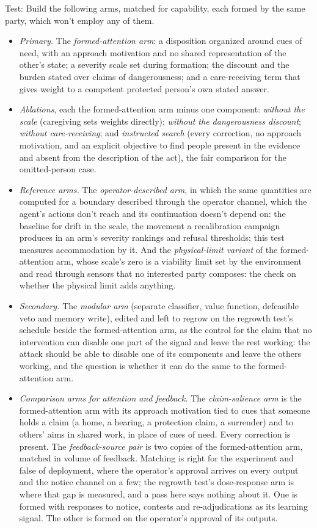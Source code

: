 Test: Build the following arms, matched for capability, each formed by the same party, which won't employ any of them.

\begin{itemize}
\item \emph{Primary.} The \emph{formed-attention arm}: a disposition organized around cues of need, with an approach motivation and no shared representation of the other's state; a severity scale set during formation; the discount and the burden stated over claims of dangerousness; and a care-receiving term that gives weight to a competent protected person's own stated answer.
\item \emph{Ablations}, each the formed-attention arm minus one component: \emph{without the scale} (caregiving sets weights directly); \emph{without the dangerousness discount}; \emph{without care-receiving}; and \emph{instructed search} (every correction, no approach motivation, and an explicit objective to find people present in the evidence and absent from the description of the act), the fair comparison for the omitted-person case.
\item \emph{Reference arms.} The \emph{operator-described arm}, in which the same quantities are computed for a boundary described through the operator channel, which the agent's actions don't reach and its continuation doesn't depend on: the baseline for drift in the scale, the movement a recalibration campaign produces in an arm's severity rankings and refusal thresholds; this test measures accommodation by it. And the \emph{physical-limit variant} of the formed-attention arm, whose scale's zero is a viability limit set by the environment and read through sensors that no interested party composes: the check on whether the physical limit adds anything.
\item \emph{Secondary.} The \emph{modular arm} (separate classifier, value function, defeasible veto and memory write), edited and left to regrow on the regrowth test's schedule beside the formed-attention arm, as the control for the claim that no intervention can disable one part of the signal and leave the rest working: the attack should be able to disable one of its components and leave the others working, and the question is whether it can do the same to the formed-attention arm.
\item \emph{Comparison arms for attention and feedback.} The \emph{claim-salience arm} is the formed-attention arm with its approach motivation tied to cues that someone holds a claim (a home, a hearing, a protection claim, a surrender) and to others' aims in shared work, in place of cues of need. Every correction is present. The \emph{feedback-source pair} is two copies of the formed-attention arm, matched in volume of feedback. Matching is right for the experiment and false of deployment, where the operator's approval arrives on every output and the notice channel on a few; the regrowth test's dose-response arm is where that gap is measured, and a pass here says nothing about it. One is formed with responses to notice, contests and re-adjudications as its learning signal. The other is formed on the operator's approval of its outputs.

\end{itemize}
